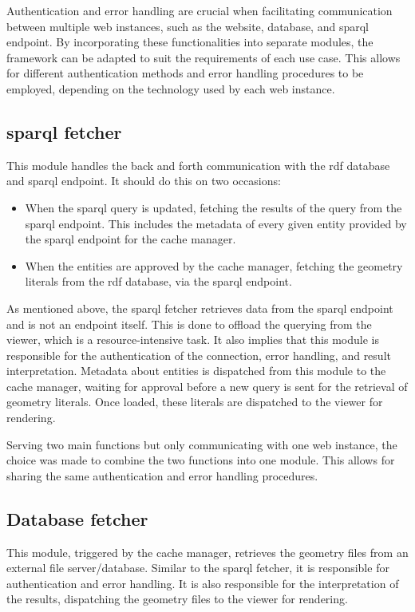 Authentication and error handling are crucial when facilitating communication between multiple web instances, such as the website, database, and \ac{sparql} endpoint. By incorporating these functionalities into separate modules, the framework can be adapted to suit the requirements of each use case. This allows for different authentication methods and error handling procedures to be employed, depending on the technology used by each web instance.

\subsection{\acs{sparql} fetcher}

This module handles the back and forth communication with the \ac{rdf} database and \ac{sparql} endpoint. It should do this on two occasions:

\begin{itemize}
  \item When the \ac{sparql} query is updated, fetching the results of the query from the \ac{sparql} endpoint. This includes the metadata of every given entity provided by the \ac{sparql} endpoint for the cache manager.
  \item When the entities are approved by the cache manager, fetching the geometry literals from the \ac{rdf} database, via the \ac{sparql} endpoint.
\end{itemize}

As mentioned above, the \ac{sparql} fetcher retrieves data from the \ac{sparql} endpoint and is not an endpoint itself. This is done to offload the querying from the viewer, which is a resource-intensive task. It also implies that this module is responsible for the authentication of the connection, error handling, and result interpretation. Metadata about entities is dispatched from this module to the cache manager, waiting for approval before a new query is sent for the retrieval of geometry literals. Once loaded, these literals are dispatched to the viewer for rendering.

Serving two main functions but only communicating with one web instance, the choice was made to combine the two functions into one module. This allows for sharing the same authentication and error handling procedures.

\subsection{Database fetcher} \label{sec:databaseFetcher}
This module, triggered by the cache manager, retrieves the geometry files from an external file server/database. Similar to the \ac{sparql} fetcher, it is responsible for authentication and error handling. It is also responsible for the interpretation of the results, dispatching the geometry files to the viewer for rendering.

